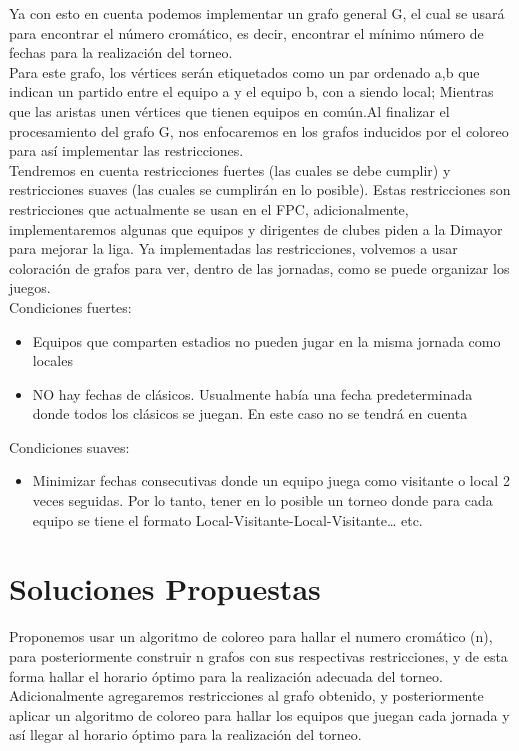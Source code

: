 \documentclass[11pt]{article}
\begin{document}
\begin{multicols}{2}
            Ya con esto en cuenta podemos implementar un grafo general G, el cual se usará para 
            encontrar el número cromático, es decir, encontrar el mínimo número de fechas para la 
            realización del torneo.\\
            Para este grafo, los vértices serán etiquetados como un par ordenado {a,b} que indican un 
            partido entre el equipo a y el equipo b, con a siendo local; Mientras que las aristas unen 
            vértices que tienen equipos en común.Al finalizar el procesamiento del grafo G, nos enfocaremos en los grafos inducidos por el 
            coloreo para así implementar las restricciones.\\[10pt]
            Tendremos en cuenta restricciones fuertes (las cuales se debe cumplir) y restricciones 
            suaves (las cuales se cumplirán en lo posible). Estas restricciones son restricciones que 
            actualmente se usan en el FPC, adicionalmente, implementaremos algunas que equipos y 
            dirigentes de clubes piden a la Dimayor para mejorar la liga. Ya implementadas las 
            restricciones, volvemos a usar coloración de grafos para ver, dentro de las jornadas, como 
            se puede organizar los juegos.\\[10pt]
            Condiciones fuertes:
            \begin{itemize}
                \item Equipos que comparten estadios no pueden jugar en la misma jornada como locales
                \item NO hay fechas de clásicos. Usualmente había una fecha predeterminada donde 
                todos los clásicos se juegan. En este caso no se tendrá en cuenta
            \end{itemize}
            Condiciones suaves:
            \begin{itemize}  
                \item Minimizar fechas consecutivas donde un equipo juega como visitante o local 2 veces 
                seguidas. Por lo tanto, tener en lo posible un torneo donde para cada equipo se tiene 
                el formato Local-Visitante-Local-Visitante… etc.     
            \end{itemize}

        \section{Soluciones Propuestas}
            Proponemos usar un algoritmo de coloreo para hallar el numero cromático (n), para 
            posteriormente construir n grafos con sus respectivas restricciones, y de esta forma 
            hallar el horario óptimo para la realización adecuada del torneo.\\
            Adicionalmente agregaremos restricciones al grafo obtenido, y posteriormente aplicar un 
            algoritmo de coloreo para hallar los equipos que juegan cada jornada y así llegar al 
            horario óptimo para la realización del torneo.
            
        
        

    \end{multicols}
\end{document}
